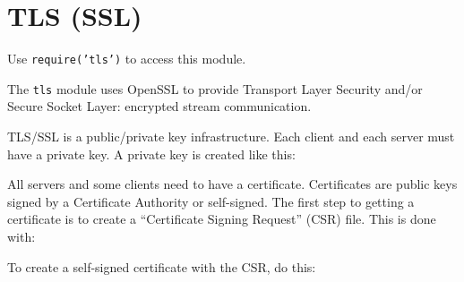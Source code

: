 \section{TLS (SSL)}\label{tls-ssl}

\begin{Shaded}
\begin{Highlighting}[]
 
\end{Highlighting}
\end{Shaded}

Use \texttt{require('tls')} to access this module.

The \texttt{tls} module uses OpenSSL to provide Transport Layer Security
and/or Secure Socket Layer: encrypted stream communication.

TLS/SSL is a public/private key infrastructure. Each client and each
server must have a private key. A private key is created like this:

\begin{Shaded}
\begin{Highlighting}[]
 
\end{Highlighting}
\end{Shaded}

All servers and some clients need to have a certificate. Certificates
are public keys signed by a Certificate Authority or self-signed. The
first step to getting a certificate is to create a ``Certificate Signing
Request'' (CSR) file. This is done with:

\begin{Shaded}
\begin{Highlighting}[]
  
\end{Highlighting}
\end{Shaded}

To create a self-signed certificate with the CSR, do this:

\begin{Shaded}
\begin{Highlighting}[]
   
\end{Highlighting}
\end{Shaded}

